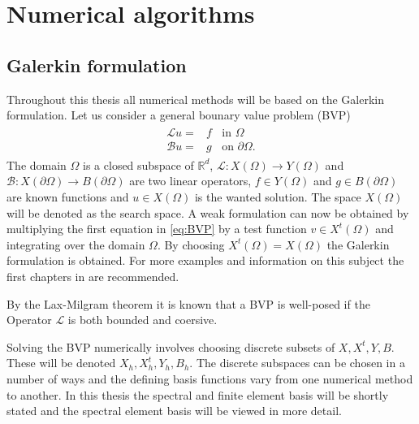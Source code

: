 
\chapter{Numerical algorithms} %

\label{numerics} %



\section{Galerkin formulation}
Throughout this thesis all numerical methods will be based on the Galerkin formulation. Let us consider a general bounary value problem (BVP)
\begin{align}
	\begin{split}
	\mathcal{L}u =& f \;\; \text{ in } \Omega\\
	\mathcal{B}u =& g \;\; \text{ on } \partial\Omega.
	\end{split}
	\label{eq:BVP}
\end{align}
The domain $\Omega$ is a closed subspace of $\mathbb{R}^d$, $\mathcal{L}: X(\Omega)\rightarrow Y(\Omega)$ and $\mathcal{B}: X(\partial\Omega)\rightarrow B(\partial\Omega)$ are two linear operators,
$f\in Y(\Omega)$ and $g\in B(\partial\Omega)$ are known functions and $u \in X(\Omega)$ is the wanted solution. 
The space $X(\Omega)$ will be denoted as the search space. A weak formulation can now be obtained by multiplying the first equation in \ref{eq:BVP} 
by a test function $v \in X^t(\Omega)$ and integrating over the domain $\Omega$. By choosing $X^t(\Omega) = X(\Omega)$ the Galerkin formulation is obtained.
For more examples and information on this subject the first chapters in \cite{Quarteroni} are recommended. 

By the Lax-Milgram theorem it is known that a BVP is well-posed if the Operator $\mathcal{L}$ is both bounded and coersive.   

Solving the BVP numerically involves choosing discrete subsets of $X,X^t,Y,B$. These will be denoted $X_h,X_h^t,Y_h,B_h$.
The discrete subspaces can be chosen in a number of ways and the defining basis functions vary from one numerical method to another. 
In this thesis the spectral and finite element basis will be shortly stated and the spectral element basis will be viewed in more detail.

